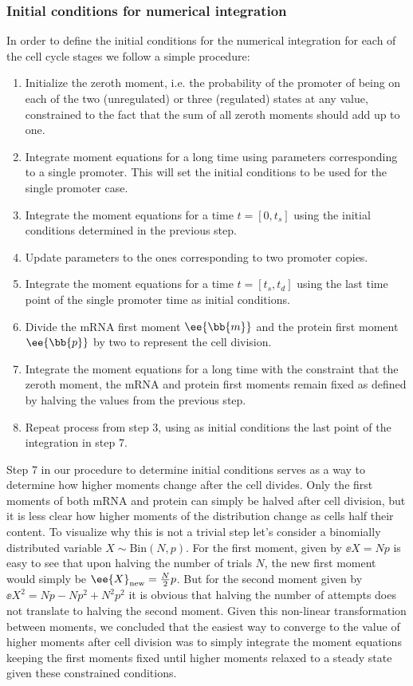 \subsubsection{Initial conditions for numerical integration}

In order to define the initial conditions for the numerical integration for each
of the cell cycle stages we follow a simple procedure:
\begin{enumerate}
  \item Initialize the zeroth moment, i.e. the probability of the promoter of
  being on each of the two (unregulated) or three (regulated) states at any
  value, constrained to the fact that the sum of all zeroth moments should add
  up to one.
  \item Integrate moment equations for a long time using parameters
  corresponding to a single promoter. This will set the initial conditions to
  be used for the single promoter case.
  \item Integrate the moment equations for a time $t = [0, t_s]$ using the
  initial conditions determined in the previous step.
  \item Update parameters to the ones corresponding to two promoter copies.
  \item Integrate the moment equations for a time $t = [t_s, t_d]$ using the
  last time point of the single promoter time as initial conditions.
  \item Divide the mRNA first moment $\ee{\bb{m}}$ and the protein first moment
  $\ee{\bb{p}}$ by two to represent the cell division.
  \item Integrate the moment equations for a long time with the constraint that
  the zeroth moment, the mRNA and protein first moments remain fixed as defined
  by halving the values from the previous step.
  \item Repeat process from step 3, using as initial conditions the last point
  of the integration in step 7.
\end{enumerate}

Step 7 in our procedure to determine initial conditions serves as a way to
determine how higher moments change after the cell divides. Only the first
moments of both mRNA and protein can simply be halved after cell division, but
it is less clear how higher moments of the distribution change as cells half
their content. To visualize why this is not a trivial step let's consider a
binomially distributed variable $X \sim \text{Bin}(N, p)$. For the first moment,
given by $\ee{X} = Np$ is easy to see that upon halving the number of trials
$N$, the new first moment would simply be $\ee{X}_{\text{new}} = {N \over 2} p$.
But for the second moment given by $\ee{X^2} = Np - Np^2 + N^2p^2$ it is obvious
that halving the number of attempts does not translate to halving the second
moment. Given this non-linear transformation between moments, we concluded that
the easiest way to converge to the value of higher moments after cell division
was to simply integrate the moment equations keeping the first moments fixed
until higher moments relaxed to a steady state given these constrained
conditions.

